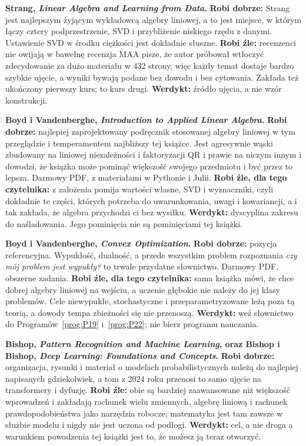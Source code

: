 \medskip
\textbf{Strang, \emph{Linear Algebra and Learning from Data}.}
\textbf{Robi dobrze:} Strang jest najlepszym żyjącym wykładowcą algebry
liniowej, a to jest miejsce, w którym łączy cztery podprzestrzenie, SVD i
przybliżenie niskiego rzędu z danymi. Ustawienie SVD w środku ciężkości jest
dokładnie słuszne.
\textbf{Robi źle:} recenzenci nie owijają w bawełnę \dash{} recenzja MAA pisze,
że autor próbował wtłoczyć zdecydowanie za dużo materiału w 432 strony, więc
każdy temat dostaje bardzo szybkie ujęcie, a wyniki bywają podane bez dowodu i
bez cytowania. Zakłada też ukończony pierwszy kurs; to kurs drugi.
\textbf{Werdykt:} źródło ujęcia, a nie wzór konstrukcji.

\medskip
\textbf{Boyd i Vandenberghe, \emph{Introduction to Applied Linear Algebra}.}
\textbf{Robi dobrze:} najlepiej zaprojektowany podręcznik stosowanej algebry
liniowej w tym przeglądzie i temperamentem najbliższy tej książce. Jest
agresywnie wąski \dash{}
zbudowany na liniowej niezależności i faktoryzacji QR i prawie na niczym innym
\dash{} i dowodzi, że książka może pominąć większość swojego przedmiotu i być
przez to lepsza. Darmowy PDF, z materiałami w Pythonie i Julii.
\textbf{Robi źle, dla tego czytelnika:} z założenia pomija wartości własne, SVD
i wyznaczniki, czyli dokładnie te części, których potrzeba do uwarunkowania,
uwagi i kowariancji, a i tak zakłada, że algebra przychodzi ci bez wysiłku.
\textbf{Werdykt:} dyscyplina zakresu do naśladowania. Jego pominięcia nie są
pominięciami tej książki.

\medskip
\textbf{Boyd i Vandenberghe, \emph{Convex Optimization}.}
\textbf{Robi dobrze:} pozycja referencyjna. Wypukłość, dualność, a przede
wszystkim problem rozpoznania \dash{} \emph{czy mój problem jest wypukły?}
\dash{} to trwale przydatne słownictwo. Darmowy PDF, obszerne zadania.
\textbf{Robi źle, dla tego czytelnika:} sama książka mówi, że chce dobrej
algebry liniowej na wejściu, a uczenie głębokie nie należy do jej klasy
problemów. Cele niewypukłe, stochastyczne i przeparametryzowane leżą poza tą
teorią, a dowody tempa zbieżności się nie przenoszą.
\textbf{Werdykt:} weź słownictwo do Programów~\ref{prog:P19}
i~\ref{prog:P22}; nie bierz programu nauczania.

\medskip
\textbf{Bishop, \emph{Pattern Recognition and Machine Learning}, oraz Bishop i
Bishop, \emph{Deep Learning: Foundations and Concepts}.}
\textbf{Robi dobrze:} organizacja, rysunki i materiał o modelach
probabilistycznych należą do najlepiej napisanych gdziekolwiek, a tom z 2024
roku przenosi to samo ujęcie na transformery i dyfuzję. \textbf{Robi źle:} obie
są bardziej zaawansowane niż większość wprowadzeń i zakładają rachunek wielu
zmiennych, algebrę liniową i rachunek prawdopodobieństwa jako narzędzia
robocze; matematyka jest tam zawsze w służbie modelu i nigdy nie jest uczona od
podłogi. \textbf{Werdykt:} cel, a nie droga \dash{} a warunkiem powodzenia tej
książki jest to, że możesz ją teraz otworzyć.

